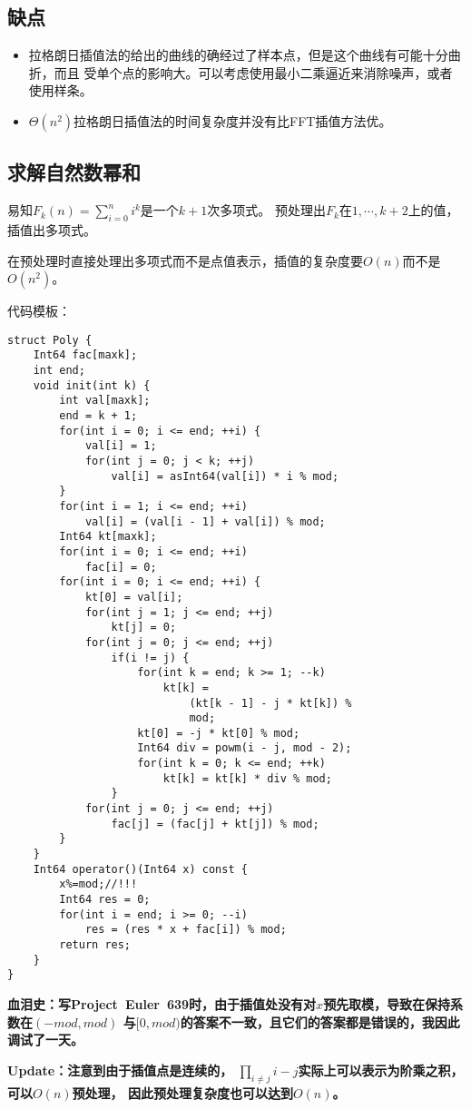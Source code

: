 \subsection{缺点}
\begin{itemize}
    \item 拉格朗日插值法的给出的曲线的确经过了样本点，但是这个曲线有可能十分曲折，而且
    受单个点的影响大。可以考虑使用最小二乘逼近来消除噪声，或者使用样条。
    \item $\Theta(n^2)$拉格朗日插值法的时间复杂度并没有比FFT插值方法优。
\end{itemize}
\subsection{求解自然数幂和}\label{psum}
易知$F_k(n)=\displaystyle \sum_{i=0}^n{i^k}$是一个$k+1$次多项式。
预处理出$F_k$在$1,\cdots,k+2$上的值，插值出多项式。

在预处理时直接处理出多项式而不是点值表示，插值的复杂度要$O(n)$而不是$O(n^2)$。

代码模板：
\begin{lstlisting}
struct Poly {
    Int64 fac[maxk];
    int end;
    void init(int k) {
        int val[maxk];
        end = k + 1;
        for(int i = 0; i <= end; ++i) {
            val[i] = 1;
            for(int j = 0; j < k; ++j)
                val[i] = asInt64(val[i]) * i % mod;
        }
        for(int i = 1; i <= end; ++i)
            val[i] = (val[i - 1] + val[i]) % mod;
        Int64 kt[maxk];
        for(int i = 0; i <= end; ++i)
            fac[i] = 0;
        for(int i = 0; i <= end; ++i) {
            kt[0] = val[i];
            for(int j = 1; j <= end; ++j)
                kt[j] = 0;
            for(int j = 0; j <= end; ++j)
                if(i != j) {
                    for(int k = end; k >= 1; --k)
                        kt[k] =
                            (kt[k - 1] - j * kt[k]) %
                            mod;
                    kt[0] = -j * kt[0] % mod;
                    Int64 div = powm(i - j, mod - 2);
                    for(int k = 0; k <= end; ++k)
                        kt[k] = kt[k] * div % mod;
                }
            for(int j = 0; j <= end; ++j)
                fac[j] = (fac[j] + kt[j]) % mod;
        }
    }
    Int64 operator()(Int64 x) const {
        x%=mod;//!!!
        Int64 res = 0;
        for(int i = end; i >= 0; --i)
            res = (res * x + fac[i]) % mod;
        return res;
    }
}
\end{lstlisting}

{\bfseries 血泪史：写Project~Euler~639时，由于插值处没有对$x$预先取模，导致在保持系数在$(-mod,mod)$
与$[0,mod)$的答案不一致，且它们的答案都是错误的，我因此调试了一天。}

{\bfseries Update：注意到由于插值点是连续的，
$\displaystyle \prod_{i\neq j}{i-j}$实际上可以表示为阶乘之积，可以$O(n)$预处理，
因此预处理复杂度也可以达到$O(n)$。}
